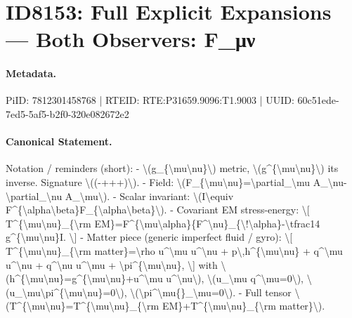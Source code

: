 \section*{ID8153: Full Explicit Expansions — Both Observers: F\_μν}
\paragraph{Metadata.}
PiID: 7812301458768 | RTEID: RTE:P31659.9096:T1.9003 | UUID: 60c51ede-7ed5-5af5-b2f0-320e082672e2

\paragraph{Canonical Statement.}
Notation / reminders (short): - \textbackslash{}(g\_\{\textbackslash{}mu\textbackslash{}nu\}\textbackslash{}) metric, \textbackslash{}(g\textasciicircum{}\{\textbackslash{}mu\textbackslash{}nu\}\textbackslash{}) its inverse. Signature \textbackslash{}((-+++)\textbackslash{}). - Field: \textbackslash{}(F\_\{\textbackslash{}mu\textbackslash{}nu\}=\textbackslash{}partial\_\textbackslash{}mu A\_\textbackslash{}nu-\textbackslash{}partial\_\textbackslash{}nu A\_\textbackslash{}mu\textbackslash{}). - Scalar invariant: \textbackslash{}(I\textbackslash{}equiv F\textasciicircum{}\{\textbackslash{}alpha\textbackslash{}beta\}F\_\{\textbackslash{}alpha\textbackslash{}beta\}\textbackslash{}). - Covariant EM stress-energy: \textbackslash{}[ T\textasciicircum{}\{\textbackslash{}mu\textbackslash{}nu\}\_\{\textbackslash{}rm EM\}=F\textasciicircum{}\{\textbackslash{}mu\textbackslash{}alpha\}\{F\textasciicircum{}\textbackslash{}nu\}\_\{\textbackslash{}!\textbackslash{}alpha\}-\textbackslash{}tfrac14 g\textasciicircum{}\{\textbackslash{}mu\textbackslash{}nu\}I. \textbackslash{}] - Matter piece (generic imperfect fluid / gyro): \textbackslash{}[ T\textasciicircum{}\{\textbackslash{}mu\textbackslash{}nu\}\_\{\textbackslash{}rm matter\}=\textbackslash{}rho u\textasciicircum{}\textbackslash{}mu u\textasciicircum{}\textbackslash{}nu + p\textbackslash{},h\textasciicircum{}\{\textbackslash{}mu\textbackslash{}nu\} + q\textasciicircum{}\textbackslash{}mu u\textasciicircum{}\textbackslash{}nu + q\textasciicircum{}\textbackslash{}nu u\textasciicircum{}\textbackslash{}mu + \textbackslash{}pi\textasciicircum{}\{\textbackslash{}mu\textbackslash{}nu\}, \textbackslash{}] with \textbackslash{}(h\textasciicircum{}\{\textbackslash{}mu\textbackslash{}nu\}=g\textasciicircum{}\{\textbackslash{}mu\textbackslash{}nu\}+u\textasciicircum{}\textbackslash{}mu u\textasciicircum{}\textbackslash{}nu\textbackslash{}), \textbackslash{}(u\_\textbackslash{}mu q\textasciicircum{}\textbackslash{}mu=0\textbackslash{}), \textbackslash{}(u\_\textbackslash{}mu\textbackslash{}pi\textasciicircum{}\{\textbackslash{}mu\textbackslash{}nu\}=0\textbackslash{}), \textbackslash{}(\textbackslash{}pi\textasciicircum{}\textbackslash{}mu\{\}\_\textbackslash{}mu=0\textbackslash{}). - Full tensor \textbackslash{}(T\textasciicircum{}\{\textbackslash{}mu\textbackslash{}nu\}=T\textasciicircum{}\{\textbackslash{}mu\textbackslash{}nu\}\_\{\textbackslash{}rm EM\}+T\textasciicircum{}\{\textbackslash{}mu\textbackslash{}nu\}\_\{\textbackslash{}rm matter\}\textbackslash{}).

